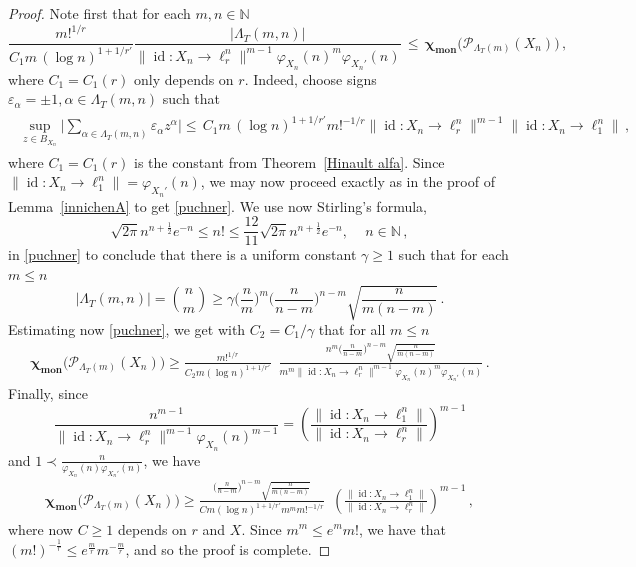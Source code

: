 \documentclass[12pt]{amsart}
\numberwithin{subsection}{section}
\theoremstyle{definition}
\theoremstyle{remark}
\DeclareMathOperator{\mon}{mon}
\DeclareMathOperator{\id}{\mathrm{id}}
\newcommand{\chimon}{\chi_{\mon}}
\begin{document}
\begin{proof}
Note first that for each $m,n \in \mathbb{N}$
\begin{equation} \label{puchner}
\frac{m!^{1/r}}{C_1m \,  (\log n)^{1+1/r'}}\frac{|\Lambda_T(m,n)|}{ \|\id \colon X_n\to \ell_r^n\|^{m-1}\varphi_{X_n}(n)^m \varphi_{X_{n}'}(n)}
\,\leq\,
\boldsymbol{\chimon}\big(\mathcal{P}_{\Lambda_T(m)}(X_n)\big)\,,
\end{equation}
where $C_1 = C_1(r)$ only depends on $r$. Indeed, choose signs $\varepsilon_\alpha = \pm 1, \alpha \in \Lambda_T(m,n)$ such that
\begin{align*} \label{poly2}
\begin{split}
\sup_{z \in B_{X_n}} \Big| \sum_{\alpha \in \Lambda_T(m,n)} \varepsilon_\alpha  z^\alpha\Big|
\leq \,C_1 m \,  (\log n)^{1+1/r'} m!^{-1/r}  \|\id\colon X_n\to \ell_r^n\|^{m-1}  \|\id \colon X_n\to \ell_1^n\|\,,
\end{split}
\end{align*}
where $C_1 = C_1(r)$ is the constant from Theorem~\ref{Hinault alfa}. Since $\|\id\colon X_n\to \ell_1^n\| = \varphi_{X_{n}'}(n)$,
we may now proceed exactly as in the proof of Lemma~\ref{innichenA} to get \eqref{puchner}. We use now
Stirling's formula,
\begin{equation*}
\sqrt{2 \pi}  n^{n + \frac{1}{2}} e^{-n} \leq n! \leq   \frac{12}{11}\sqrt{2 \pi} n^{n + \frac{1}{2}} e^{-n}, \quad\, n\in \mathbb{N}\,,
\end{equation*}
in  \eqref{puchner} to conclude that there is a uniform constant $\gamma \ge 1$ such that for each $m \leq n$
\begin{equation*}
|\Lambda_T(m,n)| = \binom{n}{m}  \ge \gamma  \Big( \frac{n}{m} \Big)^{m}  \Big( \frac{n}{n-m} \Big)^{n-m} \sqrt{\frac{n}{m(n-m)}}\,.
\end{equation*}
Estimating now \eqref{puchner}, we get with $C_2 = C_1/\gamma$ that for all $m \leq n$
\begin{align*}
\boldsymbol{\chimon}\big(\mathcal{P}_{\Lambda_T(m)}(X_n)\big) \geq
\frac{  m!^{1/r} }{C_2m   (\log n)^{1+1/r'}  }
\, \, \,  \frac{n^m\Big( \frac{n}{n-m} \Big)^{n-m} \sqrt{\frac{n}{m(n-m)}}}{m^m\|\id
\colon X_n\to \ell_r^n\|^{m-1}\varphi_{X_n}(n)^m \varphi_{X_{n}'}(n)}\,.
\end{align*}
Finally, since
$$\displaystyle \frac{n^{m-1}}{\|\id \colon X_n\to \ell_r^n\|^{m-1}\varphi_{X_n}(n)^{m-1}} =
\left(\frac{\|\id\colon X_n\to \ell_1^n\|}{\|\id \colon X_n\to \ell_r^n\|}\right)^{m-1}$$
and
$1 \prec \frac{n}{{\varphi_{X_n}(n)\varphi_{X_n'}(n)}}$, we have
\begin{align*} \boldsymbol{\chimon}\big(\mathcal{P}_{\Lambda_T(m)}(X_n)\big) \geq
\frac{\Big( \frac{n}{n-m} \Big)^{n-m} \sqrt{\frac{n}{m(n-m)}}}{Cm   (\log n)^{1+1/r'} m^m m!^{-1/r}}
\, \, \,  \left(  \frac{\|\id\colon X_n\to \ell_1^n\|}{\|\id \colon X_n\to \ell_r^n\|}\right)^{m-1}\,,
\end{align*}
where now $C \ge 1$ depends on $r$ and $X$. Since $m^m \leq e^m m!$, we have that
$(m!)^{-\frac{1}{r}} \leq e^{\frac{m}{r}} m^{-\frac{m}{r}} $, and so the proof is complete.
\end{proof}
\end{document}
